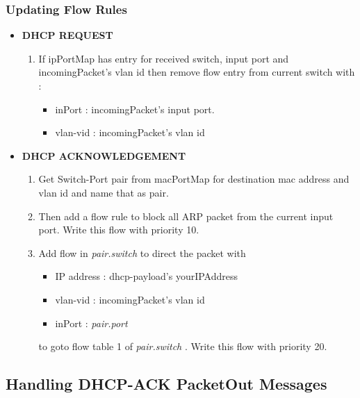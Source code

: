 \documentclass{article}
\begin{document}
\subsubsection{Updating Flow Rules}

\begin{itemize}
	\item \textbf{DHCP REQUEST}

		\begin{enumerate}
			\item If ipPortMap has entry for received switch, input port and incomingPacket's vlan id then remove flow entry from current switch with :

				\begin{itemize}
					\item inPort : incomingPacket's input port.
					\item vlan-vid : incomingPacket's vlan id
				\end{itemize}
				
		\end{enumerate}
	\item \textbf{DHCP ACKNOWLEDGEMENT}

		\begin{enumerate}
			\item Get Switch-Port pair from macPortMap for destination mac address and vlan id and name that as pair.
			\item Then add a flow rule to block all ARP packet from the  current input port. Write this flow with priority 10.
			\item Add flow in \textit{pair.switch} to direct the packet with 

				\begin{itemize}

					\item IP address : dhcp-payload's yourIPAddress
					\item vlan-vid : incomingPacket's vlan id 
					\item inPort : \textit{pair.port}
				\end{itemize}

				to goto flow table 1 of \textit{pair.switch} . Write this flow with priority 20.
		\end{enumerate}
		
\end{itemize}




\subsection{Handling DHCP-ACK PacketOut Messages}
\end{document}
